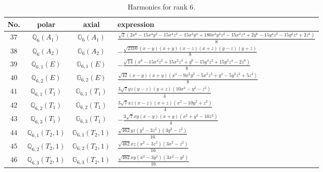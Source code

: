 \documentclass[fleqn,8pt,landscape]{jsarticle}
\begin{document}
\begin{table}[ht!]
\begin{center}
\caption{Harmonics for rank 6.}
\renewcommand{\arraystretch}{1.3}
\begin{tabular}{cccl} \hline \hline
No. & polar & axial & expression \\ \hline
$ 37 $ & $ \mathbb{Q}_{6}(A_{1}) $ & $ \mathbb{G}_{6}(A_{1}) $ & $ \frac{\sqrt{2} \left(2 x^{6} - 15 x^{4} y^{2} - 15 x^{4} z^{2} - 15 x^{2} y^{4} + 180 x^{2} y^{2} z^{2} - 15 x^{2} z^{4} + 2 y^{6} - 15 y^{4} z^{2} - 15 y^{2} z^{4} + 2 z^{6}\right)}{8} $ \\
$ 38 $ & $ \mathbb{Q}_{6}(A_{2}) $ & $ \mathbb{G}_{6}(A_{2}) $ & $ - \frac{\sqrt{2310} \left(x - y\right) \left(x + y\right) \left(x - z\right) \left(x + z\right) \left(y - z\right) \left(y + z\right)}{8} $ \\
$ 39 $ & $ \mathbb{Q}_{6,1}(E) $ & $ \mathbb{G}_{6,1}(E) $ & $ - \frac{\sqrt{14} \left(x^{6} - 15 x^{4} z^{2} + 15 x^{2} z^{4} + y^{6} - 15 y^{4} z^{2} + 15 y^{2} z^{4} - 2 z^{6}\right)}{8} $ \\
$ 40 $ & $ \mathbb{Q}_{6,2}(E) $ & $ \mathbb{G}_{6,2}(E) $ & $ \frac{\sqrt{42} \left(x - y\right) \left(x + y\right) \left(x^{4} - 9 x^{2} y^{2} - 5 x^{2} z^{2} + y^{4} - 5 y^{2} z^{2} + 5 z^{4}\right)}{8} $ \\
$ 41 $ & $ \mathbb{Q}_{6,1}(T_{1}) $ & $ \mathbb{G}_{6,1}(T_{1}) $ & $ \frac{3 \sqrt{7} y z \left(y - z\right) \left(y + z\right) \left(10 x^{2} - y^{2} - z^{2}\right)}{4} $ \\
$ 42 $ & $ \mathbb{Q}_{6,2}(T_{1}) $ & $ \mathbb{G}_{6,2}(T_{1}) $ & $ \frac{3 \sqrt{7} x z \left(x - z\right) \left(x + z\right) \left(x^{2} - 10 y^{2} + z^{2}\right)}{4} $ \\
$ 43 $ & $ \mathbb{Q}_{6,3}(T_{1}) $ & $ \mathbb{G}_{6,3}(T_{1}) $ & $ - \frac{3 \sqrt{7} x y \left(x - y\right) \left(x + y\right) \left(x^{2} + y^{2} - 10 z^{2}\right)}{4} $ \\
$ 44 $ & $ \mathbb{Q}_{6,1}(T_{2},1) $ & $ \mathbb{G}_{6,1}(T_{2},1) $ & $ \frac{\sqrt{462} y z \left(y^{2} - 3 z^{2}\right) \left(3 y^{2} - z^{2}\right)}{16} $ \\
$ 45 $ & $ \mathbb{Q}_{6,2}(T_{2},1) $ & $ \mathbb{G}_{6,2}(T_{2},1) $ & $ \frac{\sqrt{462} x z \left(x^{2} - 3 z^{2}\right) \left(3 x^{2} - z^{2}\right)}{16} $ \\
$ 46 $ & $ \mathbb{Q}_{6,3}(T_{2},1) $ & $ \mathbb{G}_{6,3}(T_{2},1) $ & $ \frac{\sqrt{462} x y \left(x^{2} - 3 y^{2}\right) \left(3 x^{2} - y^{2}\right)}{16} $ \\

\end{tabular}
\end{center}
\end{table}
\end{document}
